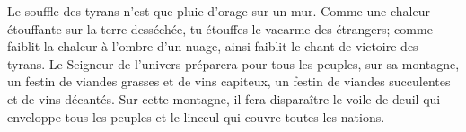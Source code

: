 Le souffle des tyrans n’est que pluie d’orage sur un mur.
Comme une chaleur étouffante sur la terre desséchée, tu étouffes le vacarme des étrangers;
	comme faiblit la chaleur à l’ombre d’un nuage,
	ainsi faiblit le chant de victoire des tyrans.
Le Seigneur de l’univers préparera pour tous les peuples, sur sa montagne,
	un festin de viandes grasses et de vins capiteux,
	un festin de viandes succulentes et de vins décantés.
Sur cette montagne, il fera disparaître le voile de deuil qui enveloppe tous les peuples
	et le linceul qui couvre toutes les nations.
